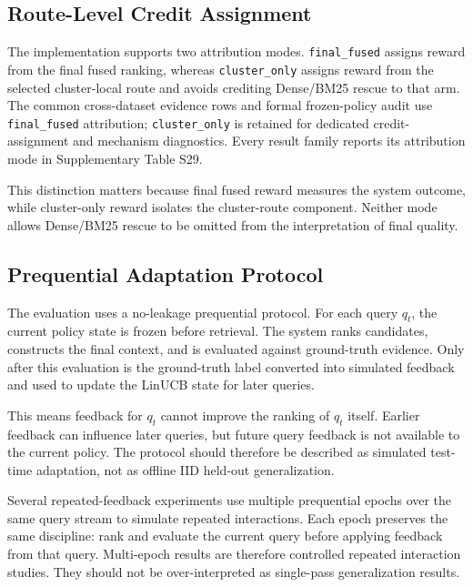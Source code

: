 \subsection{Route-Level Credit Assignment}
\label{sec:04-method:route-level-credit-assignment}

The implementation supports two attribution modes. \nolinkurl{final_fused} assigns reward from the final fused ranking, whereas \nolinkurl{cluster_only} assigns reward from the selected cluster-local route and avoids crediting Dense/BM25 rescue to that arm. The common cross-dataset evidence rows and formal frozen-policy audit use \nolinkurl{final_fused} attribution; \nolinkurl{cluster_only} is retained for dedicated credit-assignment and mechanism diagnostics. Every result family reports its attribution mode in Supplementary Table S29.

This distinction matters because final fused reward measures the system outcome, while cluster-only reward isolates the cluster-route component. Neither mode allows Dense/BM25 rescue to be omitted from the interpretation of final quality.

\subsection{Prequential Adaptation Protocol}
\label{sec:04-method:prequential-adaptation-protocol}

The evaluation uses a no-leakage prequential protocol. For each query $q_t$, the current policy state is frozen before retrieval. The system ranks candidates, constructs the final context, and is evaluated against ground-truth evidence. Only after this evaluation is the ground-truth label converted into simulated feedback and used to update the LinUCB state for later queries.

This means feedback for $q_t$ cannot improve the ranking of $q_t$ itself. Earlier feedback can influence later queries, but future query feedback is not available to the current policy. The protocol should therefore be described as simulated test-time adaptation, not as offline IID held-out generalization.

Several repeated-feedback experiments use multiple prequential epochs over the same query stream to simulate repeated interactions. Each epoch preserves the same discipline: rank and evaluate the current query before applying feedback from that query. Multi-epoch results are therefore controlled repeated interaction studies. They should not be over-interpreted as single-pass generalization results.

